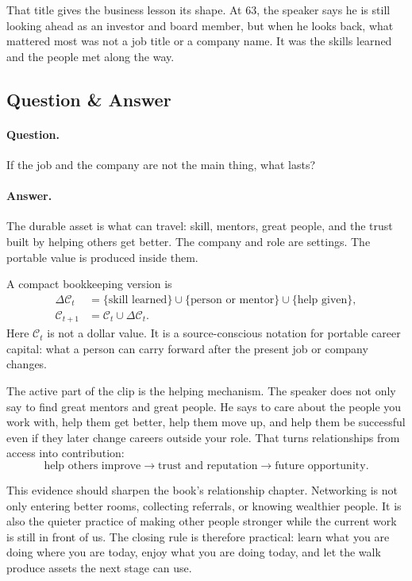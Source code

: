 \documentclass[11pt,oneside]{book}
\begin{document}
That title gives the business lesson its shape. At 63, the speaker says he is still looking ahead as an investor and board member, but when he looks back, what mattered most was not a job title or a company name. It was the skills learned and the people met along the way.

\subsection{Question \& Answer}

\paragraph{Question.}
If the job and the company are not the main thing, what lasts?

\paragraph{Answer.}
The durable asset is what can travel: skill, mentors, great people, and the trust built by helping others get better. The company and role are settings. The portable value is produced inside them.

A compact bookkeeping version is
\begin{align}
\Delta \mathcal{C}_t
&=
\{\text{skill learned}\}
\cup
\{\text{person or mentor}\}
\cup
\{\text{help given}\},\\
\mathcal{C}_{t+1}
&=
\mathcal{C}_t\cup\Delta \mathcal{C}_t.
\end{align}
Here \(\mathcal{C}_t\) is not a dollar value. It is a source-conscious notation for portable career capital: what a person can carry forward after the present job or company changes.

The active part of the clip is the helping mechanism. The speaker does not only say to find great mentors and great people. He says to care about the people you work with, help them get better, help them move up, and help them be successful even if they later change careers outside your role. That turns relationships from access into contribution:
\[
\text{help others improve}
\longrightarrow
\text{trust and reputation}
\longrightarrow
\text{future opportunity}.
\]

This evidence should sharpen the book's relationship chapter. Networking is not only entering better rooms, collecting referrals, or knowing wealthier people. It is also the quieter practice of making other people stronger while the current work is still in front of us. The closing rule is therefore practical: learn what you are doing where you are today, enjoy what you are doing today, and let the walk produce assets the next stage can use.
\end{document}
